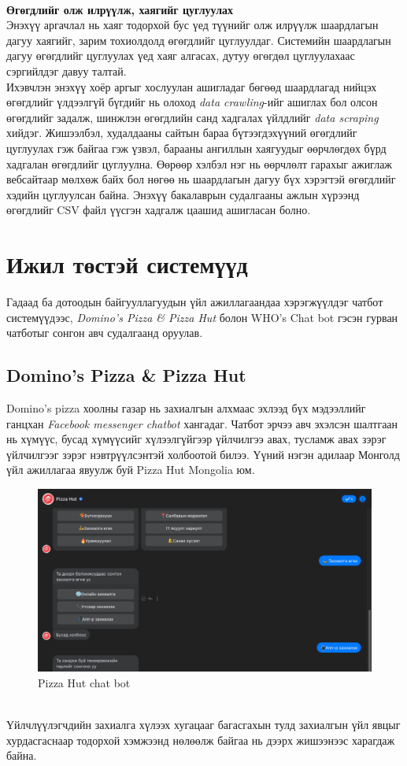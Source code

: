 \\\textbf{Өгөгдлийг олж илрүүлж, хаягийг цуглуулах}
\\Энэхүү аргачлал нь хаяг тодорхой бус үед түүнийг олж илрүүлж шаардлагын дагуу хаягийг, зарим тохиолдолд өгөгдлийг цуглуулдаг. Системийн шаардлагын дагуу өгөгдлийг цуглуулах үед хаяг алгасах, дутуу өгөгдөл цуглуулахаас сэргийлдэг давуу талтай. 
\\Ихэвчлэн энэхүү хоёр аргыг хослуулан ашигладаг бөгөөд шаардлагад нийцэх өгөгдлийг үлдээлгүй бүгдийг нь олоход \textit{data crawling}-ийг ашиглах бол олсон өгөгдлийг задалж, шинжлэн өгөгдлийн санд хадгалах үйлдлийг \textit{data scraping} хийдэг. Жишээлбэл, худалдааны сайтын бараа бүтээгдэхүүний өгөгдлийг цуглуулах гэж байгаа гэж үзвэл, барааны ангиллын хаягуудыг өөрчлөгдөх бүрд хадгалан өгөгдлийг цуглуулна. Өөрөөр хэлбэл нэг нь өөрчлөлт гарахыг ажиглаж вебсайтаар мөлхөж байх бол нөгөө нь шаардлагын дагуу бүх хэрэгтэй өгөгдлийг хэдийн цуглуулсан байна.  
Энэхүү бакалаврын судалгааны ажлын хүрээнд өгөгдлийг CSV файл үүсгэн хадгалж цаашид ашигласан болно. 
\section{Ижил төстэй системүүд}
Гадаад ба дотоодын байгууллагуудын үйл ажиллагаандаа хэрэгжүүлдэг чатбот системүүдээс, \textit{Domino's Pizza \& Pizza Hut} болон {WHO's Chat bot} гэсэн гурван чатботыг сонгон авч судалгаанд оруулав. 
\subsection{Domino's Pizza \& Pizza Hut}
Domino's pizza хоолны газар нь захиалгын алхмаас эхлээд бүх мэдээллийг ганцхан \textit{Facebook messenger chatbot} хангадаг. Чатбот эрчээ авч эхэлсэн шалтгаан нь хүмүүс, бусад хүмүүсийг хүлээлгүйгээр үйлчилгээ авах, тусламж авах зэрэг үйлчилгээг зэрэг нэвтрүүлсэнтэй холбоотой билээ. Үүний нэгэн адилаар Монголд үйл ажиллагаа явуулж буй Pizza Hut Mongolia юм.
\begin{figure}[ht]
  \centering
  \includegraphics[width=\textwidth]{images/pizzaHut.png}
  \caption{Pizza Hut chat bot}\label{fig:chatbotPizzahut}
\end{figure}
\\Үйлчлүүлэгчдийн захиалга хүлээх хугацааг багасгахын тулд захиалгын үйл явцыг хурдасгаснаар тодорхой хэмжээнд нөлөөлж байгаа нь дээрх жишээнээс харагдаж байна.


